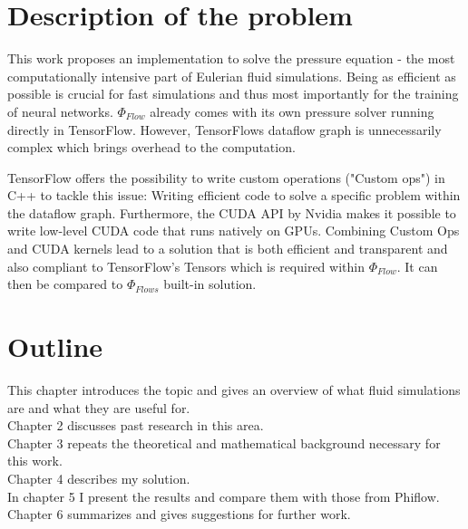 \section{Description of the problem}
This work proposes an implementation to solve the pressure equation - the most computationally intensive part of Eulerian fluid simulations. Being as efficient as possible is crucial for fast simulations and thus most importantly for the training of neural networks. $\Phi_\textit{Flow}$ already comes with its own pressure solver running directly in TensorFlow. However, TensorFlows dataflow graph is unnecessarily complex which brings overhead to the computation.
\par TensorFlow offers the possibility to write custom operations ("Custom ops") in C++ to tackle this issue: Writing efficient code to solve a specific problem within the dataflow graph. Furthermore, the CUDA API by Nvidia makes it possible to write low-level CUDA code that runs natively on GPUs. Combining Custom Ops and CUDA kernels lead to a solution that is both efficient and transparent and also compliant to TensorFlow's Tensors which is required within $\Phi_\textit{Flow}$. It can then be compared to $\Phi_\textit{Flows}$ built-in solution.
\section{Outline}
This chapter introduces the topic and gives an overview of what fluid simulations are and what they are useful for.\\
Chapter 2 discusses past research in this area.\\
Chapter 3 repeats the theoretical and mathematical background necessary for this work.\\
Chapter 4 describes my solution.\\
In chapter 5 I present the results and compare them with those from Phiflow.\\
Chapter 6 summarizes and gives suggestions for further work.\\

